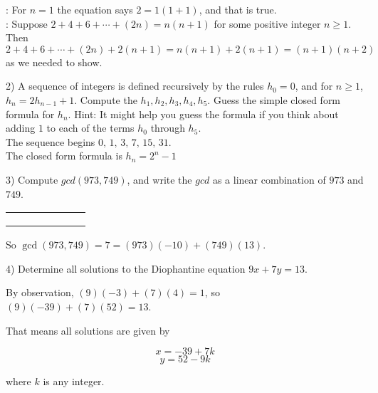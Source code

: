 \documentclass[11pt]{amsart}
\begin{document}
{\color{blue}
: For $n=1$ the equation says $2 = 1(1+1)$, and that is true.\\
: Suppose $2+4+6+\cdots+(2n) = n(n+1)$ for some positive integer $n\geq 1$.
Then 
\[
2+4+6+\cdots+(2n)+ 2(n+1) = n(n+1)+2(n+1) = (n+1)(n+2)
\]
as we needed to show.\\[5pt]
} 
\vfill

2) A sequence of integers is defined recursively by the rules $h_0= 0$, and for $n\geq 1$, $h_n = 2h_{n-1}+1$.
Compute the $h_1, h_2, h_3, h_4, h_5$. Guess the simple closed form formula for $h_n$. Hint: It might help
you guess the formula if you think about adding $1$ to each of the terms $h_0$ through $h_5$.\\[3pt]

{\color{blue}
The sequence begins $0,\, 1,\, 3,\, 7,\, 15,\, 31$.\\
 
 The closed form formula is $h_n = 2^n - 1$\\[5pt]
 }


\vfill
\break


3) Compute  $gcd(973, 749)$, and write the $gcd$ as a linear combination of $973$ and $749$.\\[3pt]

{\color{blue}
\begin{table}[!h]
\renewcommand{\arraystretch}{1.25}
\begin{tabular}{|*{7}{>{\raggedleft\arraybackslash}p{0.996cm}|}}
 \hline
 973&749&224&77&70&7&0 \\
 \hline
  &&1&3&2&1&10 \\
 \hline
 0&1&-1&4&-9&13&-139 \\
 \hline
 1&0&1&-3&7&-10&107 \\
 \hline
\end{tabular}
\end{table}

So $\gcd(973,749) = 7 = (973)(-10)+(749)(13)$.\\[5pt]
}

\vfill

4) Determine all solutions to the Diophantine equation $9x+7y = 13$.\\[5pt]
{\color{blue}
By observation, $(9)(-3) + (7)(4) = 1$, so $(9)(-39) + (7)(52) = 13$.

That means all solutions are given by 

\[x = -39 + 7k\]
\[y = 52 -9k\]

where $k$ is any integer.\\[5pt]
}
\end{document}
